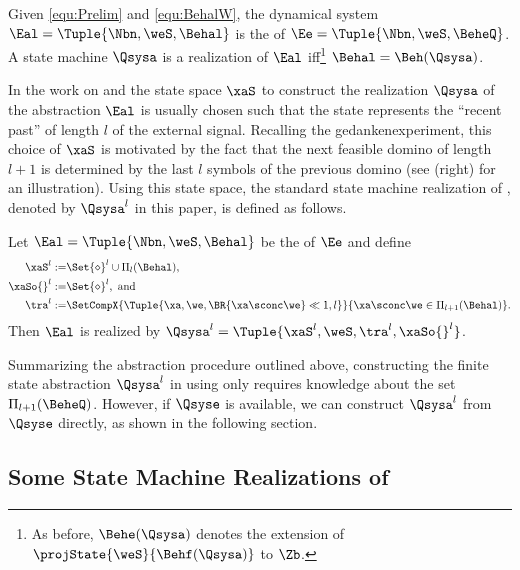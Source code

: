 \begin{definition}\label{def:SAlA_Realization}
 Given \eqref{equ:Prelim} and \eqref{equ:BehalW}, the dynamical system ${\Eal=\Tuple{\Nbn,\weS,\Behal}}$ is the \SAlA of $\Ee=\Tuple{\Nbn,\weS,\BeheQ}$. A state machine $\Qsysa$ is a realization of $\Eal$ 
iff\footnote{As before,  $\Behe(\Qsysa)$ denotes the extension of $\projState{\weS}{\Behf(\Qsysa)}$ to $\Zb$.} $\Behal=\Beh(\Qsysa)$.
\end{definition}
In the work on \SlA and \SAlA the state space $\xaS$ to construct the realization $\Qsysa$ of the abstraction $\Eal$ is usually chosen such that the state represents the \enquote{recent past} of length $l$ of the external signal. Recalling the gedankenexperiment, this choice of $\xaS$ is motivated by the fact that the  next feasible domino of length $l+1$ is determined by the last $l$ symbols of the previous domino (see  (right) for an illustration).
Using this state space, the standard state machine realization of \SAlA, denoted by $\Qsysa^l$ in this paper, is defined as follows.

\begin{proposition}\label{prop:SforLcomplete}
Let $\Eal=\Tuple{\Nbn,\weS,\Behal}$ be the \SAlA of $\Ee$ and define
\begin{subequations}\label{equ:Qsysal_old}
\begin{align}\allowdisplaybreaks
 \xaS^l:=&\Set{\diamond}^l\cup\Pi_l(\Behal),\\
 \xaSo{}^l:=&\Set{\diamond}^l,~\text{and}\\
 \tra^l:=&\SetCompX{\Tuple{\xa,\we,\BR{\xa\sconc\we}\ll{1,l}}}{\xa\sconc\we\in\Pi_{l+1}(\Behal)}.
\end{align}
\end{subequations}
Then $\Eal$ is realized by $\Qsysa^l=\Tuple{\xaS^l,\weS,\tra^l,\xaSo{}^l}$.
\end{proposition}




Summarizing the abstraction procedure outlined above, constructing the finite state abstraction $\Qsysa^l$ in  using \SAlA only requires knowledge about the set $\Pi_{l+1}(\BeheQ)$.
However, if $\Qsyse$ is available, we can construct $\Qsysa^l$ from $\Qsyse$ directly,
as shown in the following section. 




\subsection{Some State Machine Realizations of \SAlA}\label{sec:SAlA_SM}

